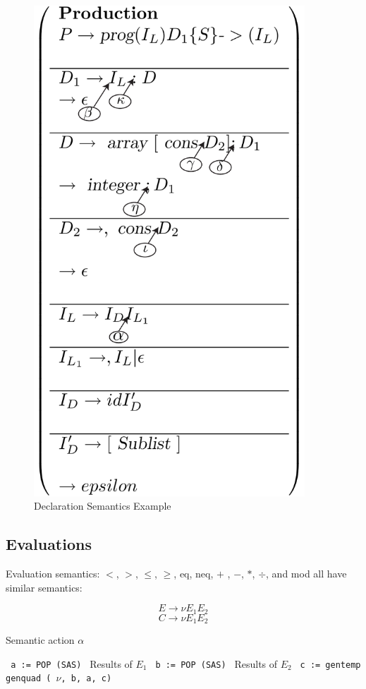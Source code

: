 \documentclass[11pt]{article}
\begin{document}
\begin{figure}[htbp] %
   \centering
   \includegraphics[width=4in]{declSemActB.pdf} 
   \caption{Declaration Semantics Example}
   \label{fig:example}
\end{figure}


\subsection {Evaluations}
Evaluation semantics:  $<$, $>$, $\le$, $\ge$, eq, neq, $+$ , $-$, $*$, $\div$, and mod  all have similar semantics:

\[ E \to \nu E_1 E_2 \]
\[ C \to \nu E_1 E_2 \]

\begin {algorithm}
\caption{ Semantic action $\alpha$ }
\label{alg:E1}
\begin{algorithmic}
\STATE \texttt { a := POP (SAS) }  Results of $E_1$
\STATE \texttt { b := POP (SAS) }  Results of $E_2$
\STATE \texttt { c := gentemp }  
\STATE \texttt { genquad ( $\nu$, b, a, c) }

\end{algorithmic}
\end{algorithm}
\end{document}
